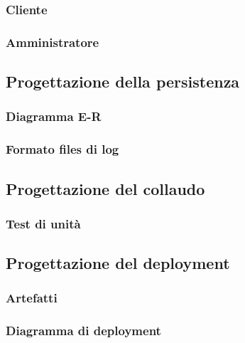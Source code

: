 \documentclass{article}
\begin{document}
\subsubsection{Cliente}

\subsubsection{Amministratore}


\subsection{Progettazione della persistenza}
\subsubsection{Diagramma E-R}

\subsubsection{Formato files di log}


\subsection{Progettazione del collaudo}
\subsubsection{Test di unità}


\subsection{Progettazione del deployment}
\subsubsection{Artefatti}



\subsubsection{Diagramma di deployment}

\end{document}
